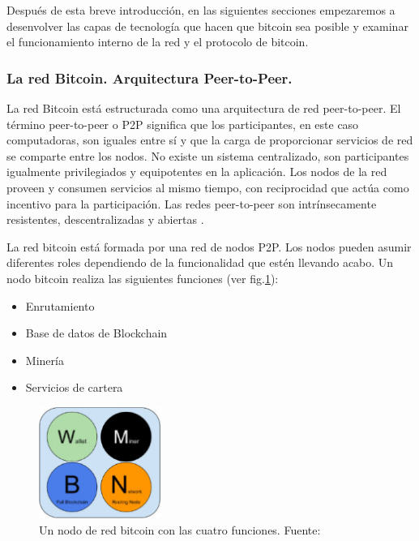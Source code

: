 \vspace{5mm}

\noindent Después de esta breve introducción, en las siguientes secciones empezaremos a desenvolver las capas de 
tecnología que hacen que bitcoin sea posible y examinar el funcionamiento interno de la red y el protocolo de bitcoin.

\subsubsection{La red Bitcoin. Arquitectura Peer-to-Peer.}

La red Bitcoin está estructurada como una arquitectura de red peer-to-peer. El término peer-to-peer o P2P significa 
que los participantes, en este caso computadoras, son iguales entre sí y que la carga de proporcionar servicios de red 
se comparte entre los nodos. No existe un sistema centralizado, son participantes igualmente privilegiados y 
equipotentes en la aplicación. Los nodos de la red proveen y consumen servicios al mismo tiempo, con reciprocidad que 
actúa como incentivo para la participación. Las redes peer-to-peer son intrínsecamente resistentes, descentralizadas y 
abiertas \cite{antonopoulos2014mastering, peer-to-peer}. 
 
\vspace{5mm}

\noindent La red bitcoin está formada por una red de nodos P2P. Los nodos pueden asumir diferentes roles dependiendo de 
la funcionalidad que estén llevando acabo. Un nodo bitcoin realiza las siguientes funciones 
(ver fig.\ref{fig:funciones-nodo}): 

\begin{itemize}
    \item Enrutamiento
    \item Base de datos de Blockchain
    \item Minería
    \item Servicios de cartera
\end{itemize}

\begin{figure}[ht!]
    \centering
    \includegraphics[width=4cm]{imagenes/introduccion/nodo_bitcoin}
    \caption{Un nodo de red bitcoin con las cuatro funciones. Fuente: \cite{antonopoulos2014mastering}}
    \label{fig:funciones-nodo}
\end{figure}

